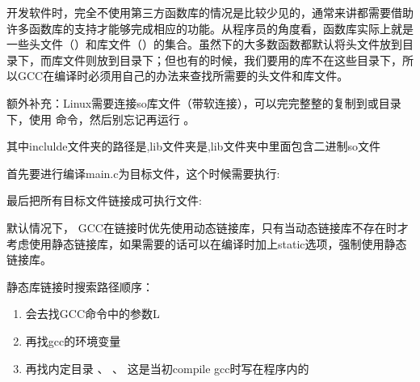 \documentclass[letterpaper,12pt,english]{sphinxmanual}
\begin{document}
\begin{DUlineblock}{0em}
\item[] 开发软件时，完全不使用第三方函数库的情况是比较少见的，通常来讲都需要借助许多函数库的支持才能够完成相应的功能。从程序员的角度看，函数库实际上就是一些头文件（）和库文件（）的集合。虽然下的大多数函数都默认将头文件放到目录下，而库文件则放到目录下；但也有的时候，我们要用的库不在这些目录下，所以GCC在编译时必须用自己的办法来查找所需要的头文件和库文件。
\item[] 额外补充：Linux需要连接so库文件（带软连接），可以完完整整的复制到或目录下，使用
 命令，然后别忘记再运行
。
\end{DUlineblock}

\begin{DUlineblock}{0em}
\item[] 其中inclulde文件夹的路径是,lib文件夹是,lib文件夹中里面包含二进制so文件
\item[] 首先要进行编译main.c为目标文件，这个时候需要执行:
\item[] 
\item[] 最后把所有目标文件链接成可执行文件:
\item[] 
\end{DUlineblock}

\begin{DUlineblock}{0em}
\item[] 默认情况下，
GCC在链接时优先使用动态链接库，只有当动态链接库不存在时才考虑使用静态链接库，如果需要的话可以在编译时加上\sphinxhyphen{}static选项，强制使用静态链接库。
\item[] 
\end{DUlineblock}

静态库链接时搜索路径顺序：
\begin{enumerate}
%
\item {} 
会去找GCC命令中的参数\sphinxhyphen{}L

\item {} 
再找gcc的环境变量

\item {} 
再找内定目录 、 、
 这是当初compile gcc时写在程序内的

\end{enumerate}
\end{document}
